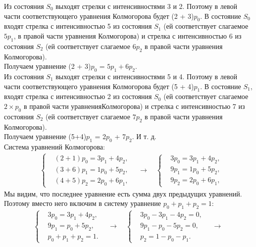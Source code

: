 \documentclass{article}
\begin{document}
\indent Из состояния $S_0$ выходят стрелки с интенсивностями 3 и 2. Поэтому в левой части соответствующего уравнения Колмогорова будет (2 + 3)$p_0$. В состояние $S_0$ входят стрелка с интенсивностью 5 из состояния $S_1$  (ей соответствует слагаемое $5p_1$,  в правой части уравнения Колмогорова) и стрелка с интенсивностью 6 из состояния $S_2$ (ей соответствует слагаемое $6p_2$ в правой части уравнения Колмогорова). \\ Получаем уравнение (2 + 3)$p_0$ = $5p_1 + 6p_2.$
 \\ \indent Из состояния $S_1$ выходят стрелки с интенсивностями 5 и 4. Поэтому в левой части соответствующего уравнения Колмогорова будет (5 + 4)$p_1$. В состояние $S_1$, входят стрелка с интенсивностью 2 из состояния $S_0$ (ей соответствует слагаемое $2 \times p_0$ в правой части уравненияКолмогорова) и стрелка с интенсивностью 7 из состояния $S_2$ (ей соответствует слагаемое $7p_2$ в правой части уравнения Колмогорова). \\  Получаем уравнение (5+4)$p_1$ = 2$p_0$ + 7$p_2$. И т. д. \\ \indent
 Система уравнений Колмогорова: \\ 
\[
\begin{aligned}
    &\left\{
    \begin{aligned}
       &(2 + 1)p_0 = 3p_1 + 4p_2,\\
        &(3 + 6)p_1 = 1p_0 + 5p_2, \\
        &(4 + 5)p_2 = 2p_0 + 6p_1,
    \end{aligned}
    \right.
    \quad \rightarrow \quad
    \left\{
    \begin{aligned}
        &3p_0 = 3p_1 + 4p_2, \\
        &9p_1 = 1p_0 + 5p_2, \\
        &9p_2 = 2p_0 + 6p_1,
    \end{aligned}
    \right.
\end{aligned}
\]
\indent Мы видим, что последнее уравнение есть сумма двух предыдущих уравнений.  Поэтому  вместо  него  включим  в  систему  уравнение
$p_0 + p_1 + p_2 = 1:$
\[
\begin{aligned}
    &\left\{
    \begin{aligned}
       &3p_0 = 3p_1 + 4p_2, \\
        &9p_1 = p_0 + 5p_2, \\
        &p_0 + p_1 + p_2 = 1.
    \end{aligned}
    \right.
    \quad \rightarrow \quad
    \left\{
    \begin{aligned}
         &3p_0 - 3p_1 - 4p_2 = 0, \\
        &9p_1 - p_0 - 5p_2 = 0, \\
        &p_2 = 1 - p_0 - p_1.
    \end{aligned}
    \right.
    \quad \rightarrow \quad
\end{aligned}
\]
\end{document}
